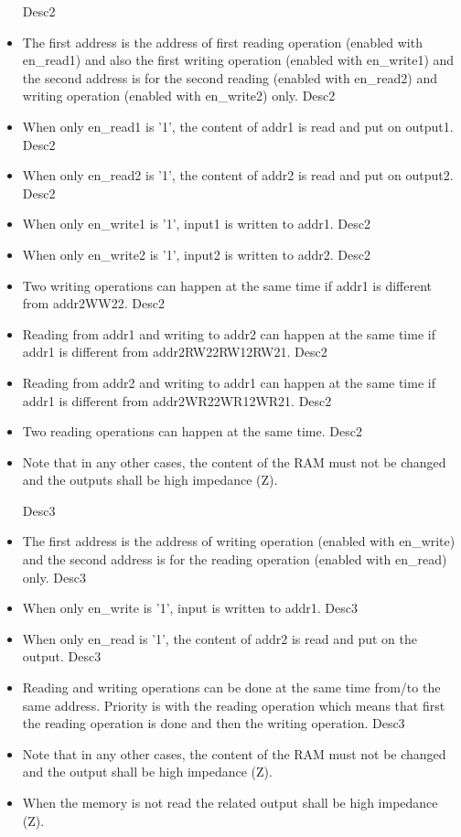 \documentclass[a4paper,12pt]{article}
\begin{document}
\begin{itemize}
{{Desc2}}\item The first address is the address of first reading operation (enabled with en\_read1) and also the first writing operation (enabled with en\_write1) and the second address is for the second reading (enabled with en\_read2) and writing operation (enabled with en\_write2) only.
{{Desc2}}\item When only en\_read1 is '1', the content of addr1 is read and put on output1.
{{Desc2}}\item When only en\_read2 is '1', the content of addr2 is read and put on output2.
{{Desc2}}\item When only en\_write1 is '1', input1 is written to addr1.
{{Desc2}}\item When only en\_write2 is '1', input2 is written to addr2.
{{Desc2}}\item Two writing operations can happen at the same time if addr1 is different from addr2{{WW22}}.
{{Desc2}}\item Reading from addr1 and writing to addr2 can happen at the same time if addr1 is different from addr2{{RW22}}{{RW12}}{{RW21}}.
{{Desc2}}\item Reading from addr2 and writing to addr1 can happen at the same time if addr1 is different from addr2{{WR22}}{{WR12}}{{WR21}}.
{{Desc2}}\item Two reading operations can happen at the same time.
{{Desc2}}\item Note that in any other cases, the content of the RAM must not be changed and the outputs shall be high impedance (Z).


{{Desc3}}\item The first address is the address of writing operation (enabled with en\_write) and the second address is for the reading operation (enabled with en\_read) only.
{{Desc3}}\item When only en\_write is '1', input is written to addr1.
{{Desc3}}\item When only en\_read is '1', the content of addr2 is read and put on the output.
{{Desc3}}\item Reading and writing operations can be done at the same time from/to the same address. Priority is with the reading operation which means that first the reading operation is done and then the writing operation.
{{Desc3}}\item Note that in any other cases, the content of the RAM must not be changed and the output shall be high impedance (Z).
\item When the memory is not read the related output shall be high impedance (Z).
\end{itemize}
\end{document}
